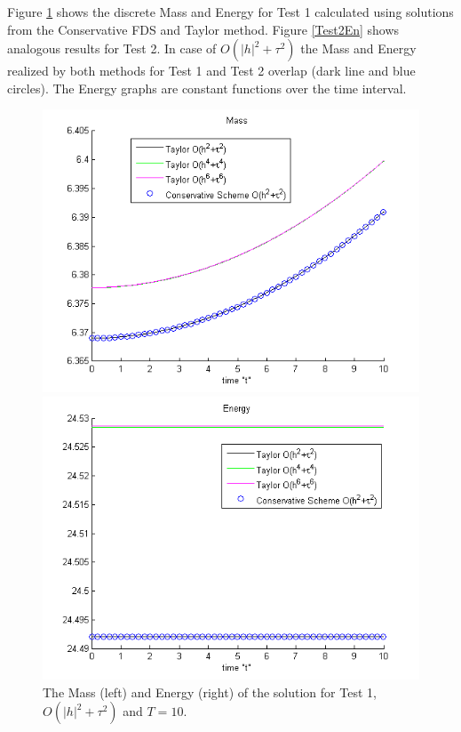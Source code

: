 \documentclass[%
 aip,
cp,  %
 amsmath,amssymb,%
 reprint,%
]{revtex4-2}
\begin{document}
Figure \ref{Test1En} shows the discrete Mass and Energy for Test 1 calculated using solutions from the Conservative FDS and Taylor method. Figure \ref{Test2En} shows analogous results for Test 2. In case of $O(|h|^2 +\tau^2)$ the Mass and Energy realized by both methods for Test 1 and Test 2 overlap (dark line and blue circles). The Energy graphs are constant functions over the time interval.
\begin{figure}[ht]\vspace{0.2cm}
	\begin{minipage}[b]{0.4\linewidth}
		 \includegraphics[width=\linewidth]{figures/Mass_bt3_c045_h005_Taylor_Conservative.png}
	\end{minipage}	
	\begin{minipage}[b]{0.4\linewidth}
		\includegraphics[width=\linewidth]{figures/Energy_bt3_c045_h005_Taylor_Conservative.png}	
	\end{minipage}
\caption{The Mass (left) and Energy (right) of the solution for Test 1, $O(|h|^2 + \tau^2)$ and $T = 10$.}
\label{Test1En}
\end{figure}
\end{document}
